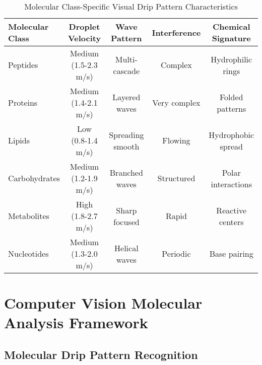 \documentclass[12pt,a4paper]{article}
\begin{document}
\begin{table}[H]
\centering
\caption{Molecular Class-Specific Visual Drip Pattern Characteristics}
\begin{tabular}{lcccc}
\toprule
Molecular Class & Droplet Velocity & Wave Pattern & Interference & Chemical Signature \\
\midrule
Peptides & Medium (1.5-2.3 m/s) & Multi-cascade & Complex & Hydrophilic rings \\
Proteins & Medium (1.4-2.1 m/s) & Layered waves & Very complex & Folded patterns \\
Lipids & Low (0.8-1.4 m/s) & Spreading smooth & Flowing & Hydrophobic spread \\
Carbohydrates & Medium (1.2-1.9 m/s) & Branched waves & Structured & Polar interactions \\
Metabolites & High (1.8-2.7 m/s) & Sharp focused & Rapid & Reactive centers \\
Nucleotides & Medium (1.3-2.0 m/s) & Helical waves & Periodic & Base pairing \\
\bottomrule
\end{tabular}
\end{table}

\section{Computer Vision Molecular Analysis Framework}

\subsection{Molecular Drip Pattern Recognition}
\end{document}
